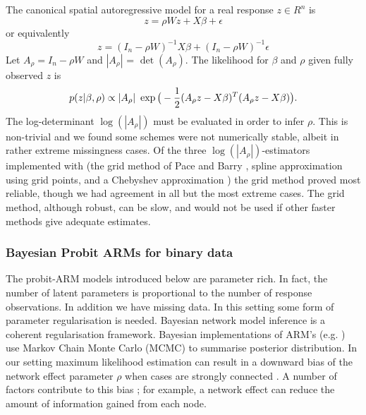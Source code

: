 \documentclass{article}
\begin{document}
	The canonical spatial autoregressive model for a real response $z\in R^n$ is
	\begin{equation}
	\label{eq:ARM1}
	z = \rho W z + X \beta + \epsilon
	\end{equation}
	or equivalently
	\begin{equation}
	z = (I_n - \rho W )^{-1} X \beta + (I_n - \rho W)^{-1} \epsilon
	\end{equation}
Let $A_\rho = I_n - \rho W $ and $|A_\rho|$ = $\det(A_\rho)$. The likelihood for $\beta$ and $\rho$ given fully observed $z$ is
	\begin{equation}
	\label{eq:bayesARM}
		p(z | \beta, \rho) \propto | A_\rho | \ \exp
		\big{(} -\frac{1}{2} (A_\rho z - X\beta)^T (A_\rho z - X\beta)\big{)}.
	\end{equation}
The log-determinant $\log(|A_\rho|)$ must be evaluated in order to infer $\rho$. This is non-trivial
and we found some schemes were not numerically stable, albeit in rather extreme missingness cases.
Of the three $\log(|A_\rho|)$-estimators implemented with \cite{wilhelm2013estimating} (the grid method of Pace and Barry \cite{pace1997quick}, spline approximation using grid points, and a Chebyshev approximation \cite{pace2004chebyshev}) the grid method proved most reliable, though we had agreement in all but the most extreme cases.
The grid method, although robust, can be slow, and would not be used if other faster methods give adequate estimates.

\subsubsection{Bayesian Probit ARMs for binary data}
 The probit-ARM models introduced below are parameter rich. In fact, the number of latent parameters is proportional
 to the number of response observations. In addition we have missing data. In this setting some form of parameter
 regularisation is needed. Bayesian network model inference
 \cites{hepple1995bayesian2, lesage1997bayesian} is a coherent regularisation framework.
 Bayesian implementations of ARM's (e.g. \cite{lesage1999applied}) use Markov Chain Monte Carlo (MCMC)
 to summarise posterior distribution. In our setting maximum likelihood estimation can result in a downward bias of the network effect parameter $\rho$ when cases are strongly connected \cites{mizruchi2008effect, neuman2010structure}. A number of factors contribute to this bias \cite{smith2009estimation}; for example, a network effect can reduce the amount of information gained from each node.
\end{document}
